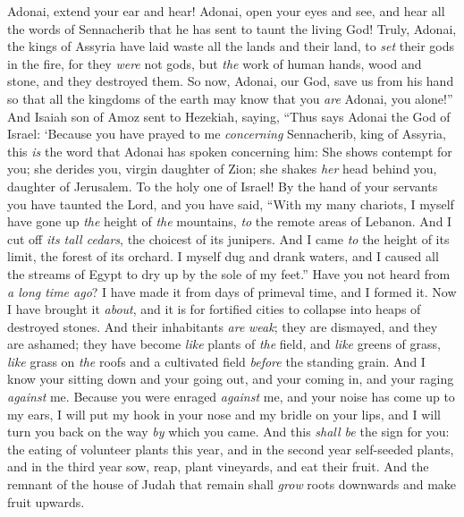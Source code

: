 \begin{biblechapter}
\verse Adonai, extend your ear and hear! Adonai, open your eyes and see, and hear all the words of Sennacherib that he has sent to taunt the living God!
\verse Truly, Adonai, the kings of Assyria have laid waste all the lands and their land,
\verse to \textit{set} their gods in the fire, for they \textit{were} not gods, but \textit{the} work of human hands, wood and stone, and they destroyed them.
\verse So now, Adonai, our God, save us from his hand so that all the kingdoms of the earth may know that you \textit{are} Adonai, you alone!”
 And Isaiah son of Amoz sent to Hezekiah, saying, “Thus says Adonai the God of Israel: ‘Because you have prayed to me \textit{concerning} Sennacherib, king of Assyria,
\verse this \textit{is} the word that Adonai has spoken concerning him:
\verse She shows contempt for you; she derides you, virgin daughter of Zion; 
she shakes \textit{her} head behind you, daughter of Jerusalem. To the holy one of Israel!
\verse By the hand of your servants you have taunted the Lord, 
and you have said, “With my many chariots, 
I myself have gone up \textit{the} height of \textit{the} mountains, 
\textit{to} the remote areas of Lebanon. 
And I cut off \textit{its tall cedars}, 
the choicest of its junipers. 
And I came \textit{to} the height of its limit, 
the forest of its orchard.
\verse I myself dug and drank waters, 
and I caused all the streams of Egypt to dry up by the sole of my feet.”
\verse Have you not heard from \textit{a long time ago}? I have made it 
from days of primeval time, and I formed it. 
Now I have brought it \textit{about}, 
and it is for fortified cities to collapse into heaps of destroyed stones.
\verse And their inhabitants \textit{are} \textit{weak}; 
they are dismayed, and they are ashamed; 
they have become \textit{like} plants of \textit{the} field, 
and \textit{like} greens of grass, 
\textit{like} grass on \textit{the} roofs 
and a cultivated field \textit{before} the standing grain.
\verse And I know your sitting down and your going out, 
and your coming in, and your raging \textit{against} me.
\verse Because you were enraged \textit{against} me, 
and your noise has come up to my ears, 
I will put my hook in your nose 
and my bridle on your lips, 
and I will turn you back 
on the way \textit{by} which you came.
\verse And this \textit{shall be} the sign for you: the eating of volunteer plants this year, and in the second year self-seeded plants, and in the third year sow, reap, plant vineyards, and eat their fruit.
\verse And the remnant of the house of Judah that remain shall \textit{grow} roots downwards and make fruit upwards.

\end{biblechapter}
